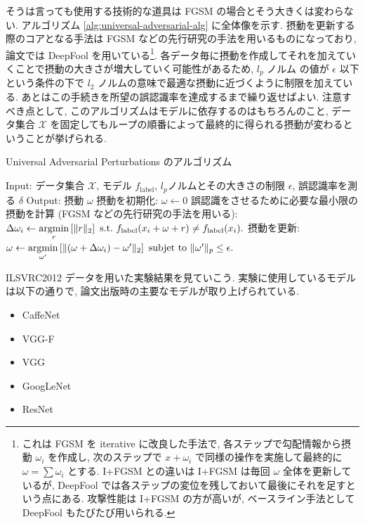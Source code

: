 そうは言っても使用する技術的な道具は FGSM の場合とそう大きくは変わらない.
アルゴリズム \ref{alg:universal-adversarial-alg} に全体像を示す.
摂動を更新する際のコアとなる手法は FGSM などの先行研究の手法を用いるものになっており, 論文では DeepFool \cite{moosavi2016deepfool} を用いている\footnote{
これは FGSM を iterative に改良した手法で, 各ステップで勾配情報から摂動 $\omega_i$ を作成し, 次のステップで $x + \omega_i$ で同様の操作を実施して最終的に $\omega = \sum \omega_i$ とする.
I+FGSM との違いは I+FGSM は毎回 $\omega$ 全体を更新しているが, DeepFool では各ステップの変位を残しておいて最後にそれを足すという点にある.
攻撃性能は I+FGSM の方が高いが, ベースライン手法として DeepFool もたびたび用いられる.
}.
各データ毎に摂動を作成してそれを加えていくことで摂動の大きさが増大していく可能性があるため, $l_p$ ノルム の値が $\epsilon$ 以下という条件の下で $l_2$ ノルムの意味で最適な摂動に近づくように制限を加えている.
あとはこの手続きを所望の誤認識率を達成するまで繰り返せばよい.
注意すべき点として, このアルゴリズムはモデルに依存するのはもちろんのこと, データ集合 $\mathcal{X}$ を固定してもループの順番によって最終的に得られる摂動が変わるということが挙げられる.
%
\begin{algorithm}
\caption{Universal Adversarial Perturbations のアルゴリズム}
\label{alg:universal-adversarial-alg}
\begin{algorithmic}[1]
    \State Input: データ集合 $\mathcal{X}$, モデル $f_{\text{label}}$, $l_p$ノルムとその大きさの制限 $\epsilon$, 誤認識率を測る
    $\delta$
    \State Output: 摂動 $\omega$
	\State 摂動を初期化: $\omega \leftarrow 0$
	\State 誤認識をさせるために必要な最小限の摂動を計算 (FGSM などの先行研究の手法を用いる): $\Delta \omega_i \leftarrow \mathop{\rm argmin}\limits_{r} \left[\|r\|_2\right] \ \text{s.t.} \  f_{\text{label}} (x_i + \omega + r) \neq f_{\text{label}} (x_i).$ 
	\State 摂動を更新: $\omega \leftarrow \mathop{\rm argmin}\limits_{\omega'} \left[ \|(\omega + \Delta \omega_i) - \omega'\|_2 \right] \ \text{subjet to} \ \|\omega'\|_p \leq \epsilon.$
	\EndIf
	\EndFor
	\EndWhile
\end{algorithmic} 
\end{algorithm}
%

ILSVRC2012 \cite{russakovsky2015imagenet} データを用いた実験結果を見ていこう.
実験に使用しているモデルは以下の通りで, 論文出版時の主要なモデルが取り上げられている.
%
\begin{itemize}
  \item CaffeNet \cite{jia2014caffe}
  \item VGG-F \cite{chatfield2014return}
  \item VGG \cite{simonyan2014very}
  \item GoogLeNet \cite{szegedy2015going}
  \item ResNet \cite{he2016deep}
\end{itemize}
%

